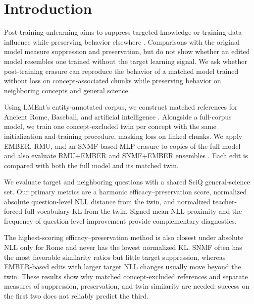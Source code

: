 \section{Introduction}
\label{sec:introduction}

Post-training unlearning aims to suppress targeted knowledge or training-data
influence while preserving behavior elsewhere
\citep{yao2024machineunlearning,li2024wmdp}. Comparisons with the original
model measure suppression and preservation, but do not show whether an edited
model resembles one trained without the target learning signal. We ask whether
post-training erasure can reproduce the behavior of a matched model trained
without loss on concept-associated chunks while preserving behavior on
neighboring concepts and general science.

Using LMEnt's entity-annotated corpus, we construct matched references for
Ancient Rome, Baseball, and artificial intelligence
\citep{gottesman2025lment}. Alongside a full-corpus model, we train one
concept-excluded twin per concept with the same initialization and training
procedure, masking loss on linked chunks. We apply EMBER, RMU, and an
SNMF-based MLP erasure to copies of the full model and also evaluate RMU+EMBER
and SNMF+EMBER ensembles
\citep{suslik2026ember,li2024wmdp,shafran2026snmf}. Each edit is compared with
both the full model and its matched twin.

We evaluate target and neighboring questions with a shared SciQ
general-science set. Our primary metrics are a harmonic efficacy--preservation
score, normalized absolute question-level NLL distance from the twin, and
normalized teacher-forced full-vocabulary KL from the twin. Signed mean NLL
proximity and the frequency of question-level improvement provide
complementary diagnostics.

The highest-scoring efficacy--preservation method is also closest under
absolute NLL only for Rome and never has the lowest normalized KL. SNMF often
has the most favorable similarity ratios but little target suppression,
whereas EMBER-based edits with larger target NLL changes usually move beyond
the twin. These results
show why matched concept-excluded references and separate measures of
suppression, preservation, and twin similarity are needed: success on the
first two does not reliably predict the third.
